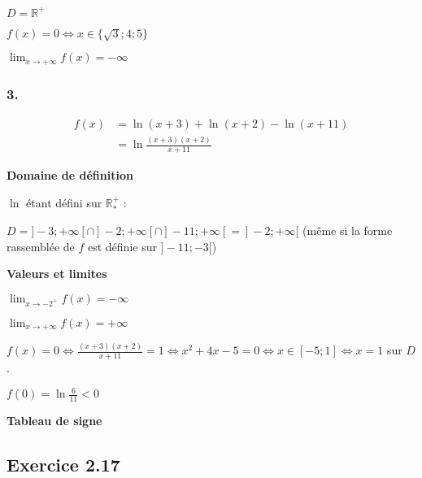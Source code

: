 \documentclass[a4paper,10pt]{report}
\begin{document}
$D = \mathbb{R}^{+}$

$f(x) = 0 \Longleftrightarrow x \in \{ \sqrt{3} ; 4 ; 5 \}$

$\lim_{x \rightarrow +\infty} f(x) = -\infty$



\subsubsection*{3.}
\begin{equation*}
	\begin{split}
		f(x) &= \ln(x+3) + \ln(x+2) - \ln(x+11) \\
		&= \ln \frac{(x+3)(x+2)}{x+11}
	\end{split}
\end{equation*}

\textbf{Domaine de définition}

$\ln$ étant défini sur $\mathbb{R}^{+}_{*}$ :

$D = ]-3 ; +\infty[ \cap ]-2 ; +\infty[ \cap ]-11 ; +\infty[ = ]-2 ; +\infty[$ (même si la forme rassemblée de $f$ est définie sur $]-11 ; -3[$)

\textbf{Valeurs et limites}

$\lim_{x \rightarrow -2^+} f(x) = -\infty$

$\lim_{x \rightarrow +\infty} f(x) = +\infty$

$f(x)=0 \Longleftrightarrow  \frac{(x+3)(x+2)}{x+11} = 1 \Longleftrightarrow x^2 +4x -5 =0 \Longleftrightarrow x \in [-5 ; 1] \Longleftrightarrow x=1$ sur $D$.

$f(0) = \ln\frac{6}{11} < 0$

\textbf{Tableau de signe}



\subsection*{Exercice 2.17}
\end{document}
